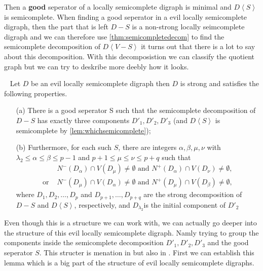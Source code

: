 Then a \textbf{good} seperator of a locally semicomplete digraph is minimal and $D\left<S\right>$ is semicomplete.
When finding a good seperator in a evil locally semicomplete digraph, then the part that is left $D-S$ is a non-strong locally seimcomplete digraph and we can therefore use \autoref{thm:semicompletedecom} to find the semicomplete decomposition of $D\left<V-S\right>$ it turns out that there is a lot to say about this decomposition. 
With this decomposistion we can classify the quotient graph but we can try to deskribe more deebly how it looks.
\begin{thm}~\cite{bangJGT85,bangJCT102}
    Let $D$ be an evil locally semicomplete digraph then $D$ is strong and satisfies the following properties.
    \begin{itemize}
        \item[(a)]There is a good seperator S such that the semicomplete decomposition of $D-S$ has exactly three components $D'_1,D'_2,D'_3$ (and $D\left<S\right>$ is semicomplete by \autoref{lem:whichsemicomplete});
        \item[(b)] Furthermore, for each such $S$, there are integers $\alpha, \beta,\mu,\nu$ with $\lambda_2\leq \alpha \leq \beta \leq p-1$ and $p+1\leq \mu \leq \nu \leq p+q$ such that 
        \begin{align}
            &N^-(D_\alpha)\cap V(D_\mu)\neq \emptyset \text{ and } N^+(D_\alpha)\cap V(D_\nu)\neq \emptyset,\\
            \text{or } &N^-(D_\mu)\cap V(D_\alpha)\neq \emptyset \text{ and } N^+(D_\mu)\cap V(D_\beta)\neq \emptyset,
        \end{align} 
        where $D_1,D_2,\dots, D_p$ and $D_{p+1},\dots,D_{p+q}$ are the strong decomposition of $D-S$ and $D\left< S\right>$, respectively, and $D_{\lambda_2}$is the initial component of $D'_2$ 
    \end{itemize}
    \label{thm:evildecom}
\end{thm}
Even though this is a structure we can work with, we can actually go deeper into the structure of this evil locally semicomplete digraph. Namly trying to group the components inside the semicomplete decomposition $D'_1,D'_2,D'_3$ and the good seperator $S$. This structer is menation in \cite{bangJGT85} but also in \cite{tildeDMCS}. First we can establish this lemma which is a big part of the structure of evil locally semicomplete digraphs.
